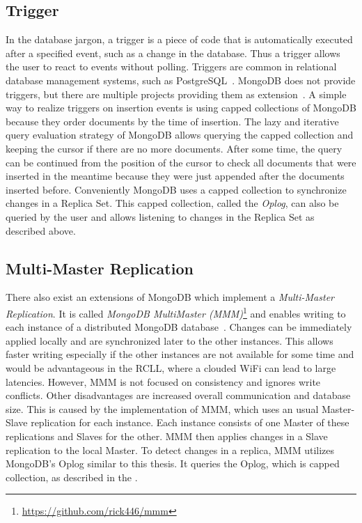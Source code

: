 \subsection{Trigger}
\label{sec:mongodb-trigger}
In the database jargon, a trigger is a piece of code that is
automatically executed after a specified event, such as a change in
the database. Thus a trigger allows the user to react to events
without polling. Triggers are common in relational database management
systems, such as PostgreSQL~\cite{postgresql}. MongoDB does not
provide triggers, but there are multiple projects providing them as
extension~\cite{mongodb-trigger}. A simple way to realize
triggers on insertion events is using capped collections of MongoDB
because they order documents by the time of
insertion.  The lazy and
iterative query evaluation strategy of MongoDB allows querying the
capped collection and keeping the cursor if there are no more
documents. After some time, the query can be continued from the
position of the cursor to check all documents that were inserted in the
meantime because they were just appended after the documents inserted
before. Conveniently MongoDB uses a capped collection to synchronize
changes in a Replica Set. This capped collection, called the
\emph{Oplog}, can also be queried by the user and allows listening to
changes in the Replica Set as described above.

\subsection{Multi-Master Replication}
\label{sec:mongodb-multi-master}
There also exist an extensions of MongoDB which implement a
\emph{Multi-Master Replication}. It is called \emph{MongoDB
  MultiMaster (MMM)}\footnote{\url{https://github.com/rick446/mmm}}
and enables writing to each instance of a distributed MongoDB
database~\cite{mongodb-multi-master}. Changes can be immediately
applied locally and are synchronized later to the other
instances. This allows faster writing especially if the other
instances are not available for some time and would be advantageous in
the RCLL, where a clouded WiFi can lead to large latencies. However,
MMM is not focused on consistency and ignores write conflicts. Other
disadvantages are increased overall communication and database
size. This is caused by the implementation of MMM, which uses an usual
Master-Slave replication for each instance. Each instance consists of
one Master of these replications and Slaves for the other. MMM then
applies changes in a Slave replication to the local Master.  To detect
changes in a replica, MMM utilizes MongoDB's Oplog similar to this
thesis. It queries the Oplog, which is capped collection, as described
in the .

